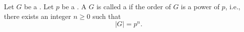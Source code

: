 \begin{definition} \label{definition:p_group_of_finite_order}
Let $G$ be a  . Let $p$ be a .
A  $G$ is called a  if the order of $G$ is a power of $p$, i.e., there exists an integer $n \geq 0$ such that
$$|G| = p^n.$$
\end{definition}